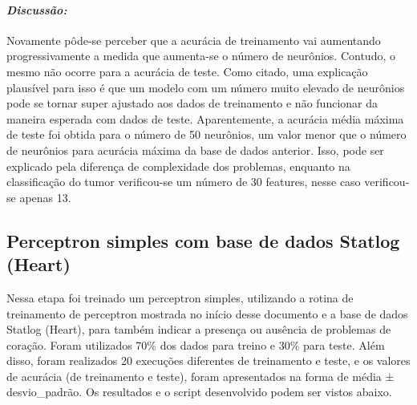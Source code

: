 \documentclass[
]{article}
\begin{document}
\hypertarget{discussuxe3o-2}{%
\paragraph{\texorpdfstring{\textbf{\emph{Discussão:}}}{Discussão:}}\label{discussuxe3o-2}}

Novamente pôde-se perceber que a acurácia de treinamento vai aumentando
progressivamente a medida que aumenta-se o número de neurônios. Contudo,
o mesmo não ocorre para a acurácia de teste. Como citado, uma explicação
plausível para isso é que um modelo com um número muito elevado de
neurônios pode se tornar super ajustado aos dados de treinamento e não
funcionar da maneira esperada com dados de teste. Aparentemente, a
acurácia média máxima de teste foi obtida para o número de 50 neurônios,
um valor menor que o número de neurônios para acurácia máxima da base de
dados anterior. Isso, pode ser explicado pela diferença de complexidade
dos problemas, enquanto na classificação do tumor verificou-se um número
de 30 features, nesse caso verificou-se apenas 13.

\hypertarget{perceptron-simples-com-base-de-dados-statlog-heart}{%
\subsection{Perceptron simples com base de dados Statlog
(Heart)}\label{perceptron-simples-com-base-de-dados-statlog-heart}}

Nessa etapa foi treinado um perceptron simples, utilizando a rotina de
treinamento de perceptron mostrada no início desse documento e a base de
dados Statlog (Heart), para também indicar a presença ou ausência de
problemas de coração. Foram utilizados 70\% dos dados para treino e 30\%
para teste. Além disso, foram realizados 20 execuções diferentes de
treinamento e teste, e os valores de acurácia (de treinamento e teste),
foram apresentados na forma de média ± desvio\_padrão. Os resultados e o
script desenvolvido podem ser vistos abaixo.
\end{document}
